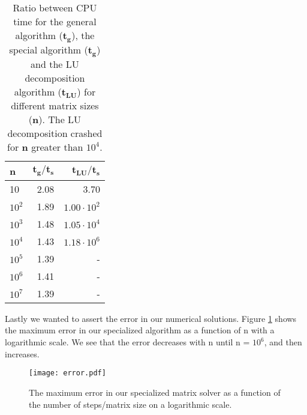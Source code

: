 \begin{table}[htbp]
	\centering
	\begin{tabular}{lrr}
		\textbf{n} & $\mathbf{{t_g}/{t_s}}$ & $\mathbf{{t_{LU}}/{t_s}}$  \\
		\midrule
		\addlinespace[0.1cm]
		
		10         & 2.08                                                                                          & 3.70                                                                                        \\
		$10^2$       & 1.89                                                                                          & $1.00\cdot 10^2 $                                                                                         \\
		$10^3$       & 1.48                                                                                          & $1.05 \cdot 10^4 $                                                                                        \\
		$10^4$       & 1.43                                                                                          & $1.18 \cdot 10^6$                                                                                         \\
		$10^5$       & 1.39                                                                                          & -                                                                                         \\
		$10^6$       & 1.41                                                                                          & -                                                                                        \\
		$10^7$       & 1.39                                                                                          &    -                                                                                    
	\end{tabular}  \caption{Ratio between CPU time for the general algorithm ($\mathbf{t_g}$), the special algorithm ($\mathbf{t_g}$) and the LU decomposition algorithm ($\mathbf{t_{LU}}$) for different matrix sizes (\textbf{n}). The LU decomposition crashed for \textbf{n} greater than $10^4$.} \label{table:time}
\end{table} 

Lastly we wanted to assert the error in our numerical solutions. Figure \ref{fig:error} shows the maximum error in our specialized algorithm as a function of n with a logarithmic scale. We see that the error decreases with n until n = $10^6$, and then increases. 

\begin{figure}[htbp]
	\centering
	\texttt{[image: error.pdf]}
	\caption{The maximum error in our specialized matrix solver as a function of the number of steps/matrix size on a logarithmic scale.}
	\label{fig:error}
\end{figure}